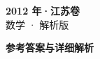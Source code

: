 \documentclass[zihao=-4, a4paper]{ctexart}
\begin{document}
\begin{center}
  {\Large\bfseries 2012 年·江苏卷}\\[4pt]
  {\large 数学 · 解析版}
\end{center}
\medskip
{}

\clearpage
{}
\begin{center}{\Large\bfseries 参考答案与详细解析}\end{center}
\medskip

\end{document}
